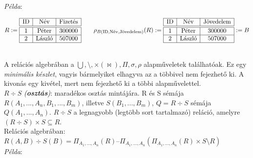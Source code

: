 \documentclass[tikz,12pt,margin=0px]{article}
\begin{document}
    \noindent \textit{Példa}:

    \begin{center}
        $R := \begin{array}{|c|c|c|}
            \hline
            \text{ID} & \text{Név} & \text{Fizetés} \\ \hline \hline
            1 & \text{Péter} & 300000  \\ \hline
            2 & \text{László} & 507000 \\ \hline
        \end{array} \qquad \rho_{B(\text{ID}, \text{Név}, \text{Jövedelem})}(R) :=
        \begin{array}{|c|c|c|}
            \hline
            \text{ID} & \text{Név} & \text{Jövedelem} \\ \hline \hline
            1 & \text{Péter} & 300000  \\ \hline
            2 & \text{László} & 507000 \\ \hline
        \end{array} := B$ \\
    \end{center}

    \ \\

    \noindent A relációs algebrában a $\bigcup, \setminus, \times (\bowtie), \Pi, \sigma, \rho$ alapműveletek találhatóak. Ez egy \textit{minimális készlet}, vagyis bármelyiket elhagyva az a többivel nem fejezhető ki. A kivonás egy kivétel, mert nem fejezhető ki a többi alapművelettel.\\

    \noindent $R \div S$ \textit{(\textbf{osztás})}: maradékos osztás mintájára. R és S sémája $R(A_1,...,A_n,B_1,...,B_m)$, illetve $S(B_1,...,B_m)$, $Q = R \div S$ sémája $Q(A_1,...,A_n)$. $R \div S$ a legnagyobb (legtöbb sort tartalmazó) reláció, amelyre $( R \div S ) \times S \subseteq R.$\\

    \noindent Relációs algebrában: $R(A,B) \div S(B) = \Pi_{A_1, \ldots, A_n}(R) – \Pi_{A_1,...,A_n}( \Pi_{A_1, \ldots, A_n}(R) \times S \setminus R )$\\

    \noindent \textit{Példa}:
\end{document}
